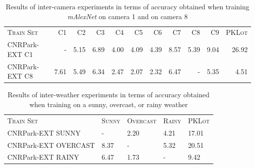 \begin{table}
\begin{tabularx}{\linewidth}{Xrrrrrrrrrr}
\toprule
\textsc{Train Set} &   \textsc{C1} &   \textsc{C2} &   \textsc{C3} &   \textsc{C4} &   \textsc{C5} &   \textsc{C6} &   \textsc{C7} &   \textsc{C8} &   \textsc{C9} & \textsc{PKLot} \\
                   \cmidrule(lr){2-2} \cmidrule(lr){3-3} \cmidrule(lr){4-4} \cmidrule(lr){5-5} \cmidrule(lr){6-6} \cmidrule(lr){7-7} \cmidrule(lr){8-8} \cmidrule(lr){9-9} \cmidrule(lr){10-10} \cmidrule(lr){11-11}
CNRPark-EXT C1 &    - & 5.15 & 6.89 & 4.00 & 4.09 & 4.39 & 8.57 & 5.39 & 9.04 & 26.92 \\
CNRPark-EXT C8 & 7.61 & 5.49 & 6.34 & 2.47 & 2.07 & 2.32 & 6.47 &    - & 5.35 &  4.51 \\
\bottomrule
\end{tabularx}
\caption{Results of inter-camera experiments in terms of accuracy obtained when training \emph{mAlexNet} on camera 1 and on camera 8}
\label{tab:mini:inter-camera}
\end{table}

\begin{table}
\begin{tabularx}{\linewidth}{lRRRR}
\toprule
\textsc{Train Set} & \textsc{Sunny} & \textsc{Overcast} & \textsc{Rainy} & \textsc{PKLot} \\
                     \cmidrule(lr){2-2} \cmidrule(lr){3-3} \cmidrule(lr){4-4} \cmidrule(lr){5-5}
CNRPark-EXT SUNNY    &    - & 2.20  & 4.21 & 17.01 \\
CNRPark-EXT OVERCAST & 8.37 &    -  & 5.32 & 20.51 \\
CNRPark-EXT RAINY    & 6.47 & 1.73  &    - &  9.42 \\
\bottomrule
\end{tabularx}
\caption{Results of inter-weather experiments in terms of accuracy obtained when training on a sunny, overcast, or rainy weather}
\label{tab:mini:inter-weather}
\end{table}

